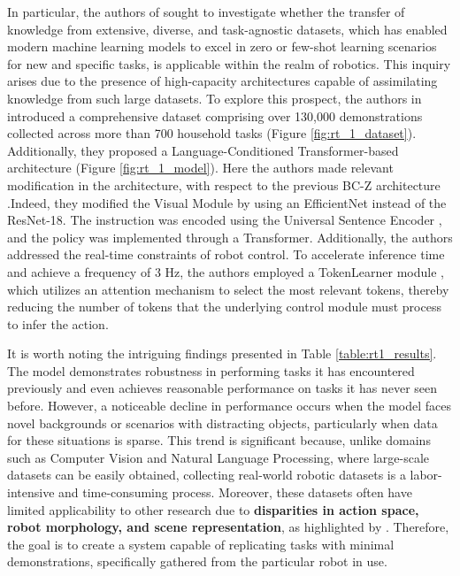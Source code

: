 In particular, the authors of \cite{brohan2022rt} sought to investigate whether the transfer of knowledge from extensive, diverse, and task-agnostic datasets, which has enabled modern machine learning models to excel in zero or few-shot learning scenarios for new and specific tasks, is applicable within the realm of robotics. This inquiry arises due to the presence of high-capacity architectures capable of assimilating knowledge from such large datasets. To explore this prospect, the authors in \cite{brohan2022rt} introduced a comprehensive dataset comprising over 130,000 demonstrations collected across more than 700 household tasks (Figure \ref{fig:rt_1_dataset}). Additionally, they proposed a Language-Conditioned Transformer-based architecture (Figure \ref{fig:rt_1_model}). Here the authors made relevant modification in the architecture, with respect to the previous BC-Z architecture \cite{jang2022bc_z}.Indeed, they modified the Visual Module by using an EfficientNet \cite{tan2019efficientnet} instead of the ResNet-18. The instruction was encoded using the Universal Sentence Encoder \cite{cer2018universal}, and the policy was implemented through a Transformer. Additionally, the authors addressed the real-time constraints of robot control. To accelerate inference time and achieve a frequency of $3$ Hz, the authors employed a TokenLearner module \cite{ryoo2021tokenlearner}, which utilizes an attention mechanism to select the most relevant tokens, thereby reducing the number of tokens that the underlying control module must process to infer the action.



It is worth noting the intriguing findings presented in Table \ref{table:rt1_results}. The model demonstrates robustness in performing tasks it has encountered previously and even achieves reasonable performance on tasks it has never seen before. However, a noticeable decline in performance occurs when the model faces novel backgrounds or scenarios with distracting objects, particularly when data for these situations is sparse. This trend is significant because, unlike domains such as Computer Vision and Natural Language Processing, where large-scale datasets can be easily obtained, collecting real-world robotic datasets is a labor-intensive and time-consuming process. Moreover, these datasets often have limited applicability to other research due to \textbf{disparities in action space, robot morphology, and scene representation}, as highlighted by \cite{brohan2022rt}. Therefore, the goal is to create a system capable of replicating tasks with minimal demonstrations, specifically gathered from the particular robot in use.

